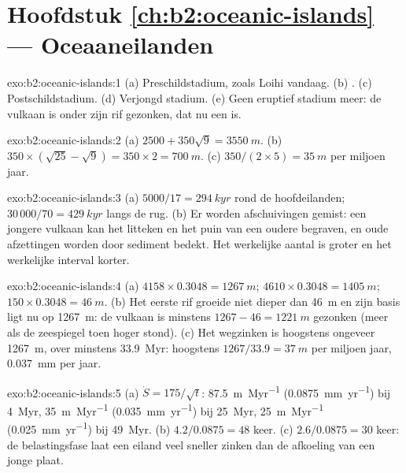 \section*{Hoofdstuk \ref{ch:b2:oceanic-islands} --- Oceaaneilanden}

\begin{solution}{exo:b2:oceanic-islands:1}
(a) Preschildstadium, zoals Loihi vandaag. (b) . (c) Postschildstadium. (d) Verjongd
stadium. (e) Geen eruptief stadium meer: de vulkaan is onder zijn rif gezonken, dat nu een  is.
\end{solution}

\begin{solution}{exo:b2:oceanic-islands:2}
(a) $2500 + 350\sqrt9 = \qty{3550}{m}$. (b) $350\times(\sqrt{25} - \sqrt9) = 350\times2 =
\qty{700}{m}$. (c) $350/(2\times5) = \qty{35}{m}$ per miljoen jaar.
\end{solution}

\begin{solution}{exo:b2:oceanic-islands:3}
(a) $5000/17 = \qty{294}{kyr}$ rond de hoofdeilanden; $30\,000/70 = \qty{429}{kyr}$ langs de
rug. (b) Er worden afschuivingen gemist: een jongere vulkaan kan het litteken en het puin van een oudere begraven,
en oude afzettingen worden door sediment bedekt. Het werkelijke aantal is groter en het werkelijke interval
korter.
\end{solution}

\begin{solution}{exo:b2:oceanic-islands:4}
(a) $4158\times0.3048 = \qty{1267}{m}$; $4610\times0.3048 = \qty{1405}{m}$; $150\times0.3048 =
\qty{46}{m}$. (b) Het eerste rif groeide niet dieper dan \qty{46}{m} en zijn basis ligt nu op
\qty{1267}{m}: de vulkaan is minstens $1267 - 46 = \qty{1221}{m}$ gezonken (meer als de zeespiegel
toen hoger stond). (c) Het wegzinken is hoogstens ongeveer \qty{1267}{m}, over minstens \qty{33.9}{Myr}:
hoogstens $1267/33.9 = \qty{37}{m}$ per miljoen jaar, \qty{0.037}{mm} per jaar.
\end{solution}

\begin{solution}{exo:b2:oceanic-islands:5}
(a) $\dot S = 175/\sqrt t$: \qty{87.5}{m.Myr^{-1}} (\qty{0.0875}{mm.yr^{-1}}) bij \qty{4}{Myr},
\qty{35}{m.Myr^{-1}} (\qty{0.035}{mm.yr^{-1}}) bij \qty{25}{Myr}, \qty{25}{m.Myr^{-1}}
(\qty{0.025}{mm.yr^{-1}}) bij \qty{49}{Myr}. (b) $4.2/0.0875 = 48$ keer. (c) $2.6/0.0875 = 30$
keer: de belastingsfase laat een eiland veel sneller zinken dan de afkoeling van een jonge plaat.
\end{solution}

